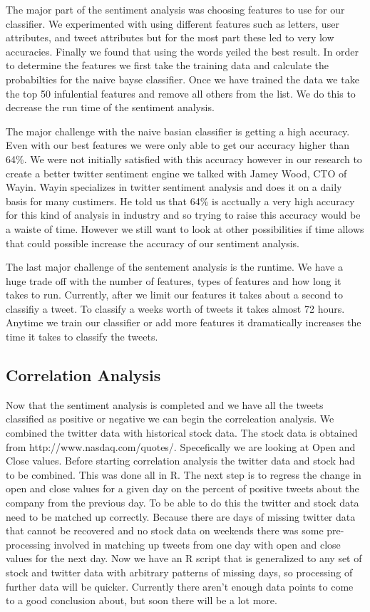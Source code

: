 \documentclass{acm_proc_article-sp}
\begin{document}
The major part of the sentiment analysis was choosing features to use for our
classifier. We experimented with using different features such as letters, user
attributes, and tweet attributes but for the most part these led to very low
accuracies. Finally we found that using the words yeiled the best result. In
order to determine the features we first take the training data and calculate
the probabilties for the naive bayse classifier. Once we have trained the data
we take the top 50 infulential features and remove all others from the list. We
do this to decrease the run time of the sentiment analysis.

The major challenge with the naive basian classifier is getting a high
accuracy. Even with our best features we were only able to get our accuracy
higher than 64\%.  We were not initially satisfied with this accuracy however
in our research to create a better twitter sentiment engine we talked with
Jamey Wood, CTO of Wayin. Wayin specializes in twitter sentiment analysis and
does it on a daily basis for many custimers. He told us that 64\% is acctually
a very high accuracy for this kind of analysis in industry and so trying to
raise this accuracy would be a waiste of time. However we still want to look at
other possibilities if time allows that could possible increase the accuracy of
our sentiment analysis. 

The last major challenge of the sentement analysis is the runtime. We have a
huge trade off with the number of features, types of features and how long it
takes to run. Currently, after we limit our features it takes about a second to
classifiy a tweet. To classify a weeks worth of tweets it takes almost 72
hours. Anytime we train our classifier or add more features it dramatically
increases the time it takes to classify the tweets.

\subsection{Correlation Analysis}

Now that the sentiment analysis is completed and we have all the tweets
classified as positive or negative we can begin the correleation analysis. We
combined the twitter data with historical stock data. The stock data is
obtained from http://www.nasdaq.com/quotes/. Specefically we are looking at
Open and Close values. Before starting correlation analysis the twitter data
and stock had to be combined. This was done all in R. The next step is to
regress the change in open and close values for a given day on the percent of
positive tweets about the company from the previous day. To be able to do this
the twitter and stock data need to be matched up correctly. Because there are
days of missing twitter data that cannot be recovered and no stock data on
weekends there was some pre-processing involved in matching up tweets from one
day with open and close values for the next day. Now we have an R script that
is generalized to any set of stock and twitter data with arbitrary patterns of
missing days, so processing of further data will be quicker. Currently there
aren't enough data points to come to a good conclusion about, but soon there
will be a lot more.
\end{document}
